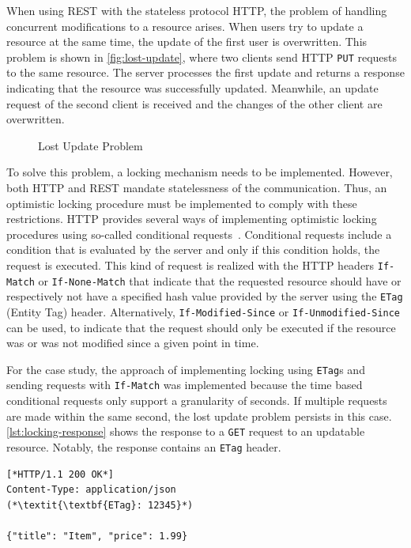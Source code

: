 When using \ac{REST} with the stateless protocol \ac{HTTP}, the problem of handling concurrent modifications to a resource arises.
When users try to update a resource at the same time, the update of the first user is overwritten.
This problem is shown in \autoref{fig:lost-update}, where two clients send \ac{HTTP} \texttt{PUT} requests to the same resource.
The server processes the first update and returns a response indicating that the resource was successfully updated.
Meanwhile, an update request of the second client is received and the changes of the other client are overwritten.

\begin{figure}[!htb]
    \centering
    
    \caption{Lost Update Problem}\label{fig:lost-update}
\end{figure}

To solve this problem, a locking mechanism needs to be implemented.
However, both \ac{HTTP} and \ac{REST} mandate statelessness of the communication.
Thus, an optimistic locking procedure must be implemented to comply with these restrictions.
\ac{HTTP} provides several ways of implementing optimistic locking procedures using so-called conditional requests~\cite{MDN2020}.
Conditional requests include a condition that is evaluated by the server and only if this condition holds, the request is executed.
This kind of request is realized with the \ac{HTTP} headers \texttt{If-Match} or \texttt{If-None-Match} that indicate that the requested resource should have or respectively not have a specified hash value provided by the server using the \texttt{ETag} (Entity Tag) header.
Alternatively, \texttt{If-Modified-Since} or \texttt{If-Unmodified-Since} can be used, to indicate that the request should only be executed if the resource was or was not modified since a given point in time.

For the case study, the approach of implementing locking using \texttt{ETag}s and sending requests with \texttt{If-Match} was implemented because the time based conditional requests only support a granularity of seconds.
If multiple requests are made within the same second, the lost update problem persists in this case.
\autoref{lst:locking-response} shows the response to a \texttt{GET} request to an updatable resource.
Notably, the response contains an \texttt{ETag} header.

\begin{lstlisting}[caption={Response to \texttt{GET} Requests for Updatable Resources}, showlines=true, label=lst:locking-response, language=http]
[*HTTP/1.1 200 OK*]
Content-Type: application/json
(*\textit{\textbf{ETag}: 12345}*)

{"title": "Item", "price": 1.99}
\end{lstlisting}

